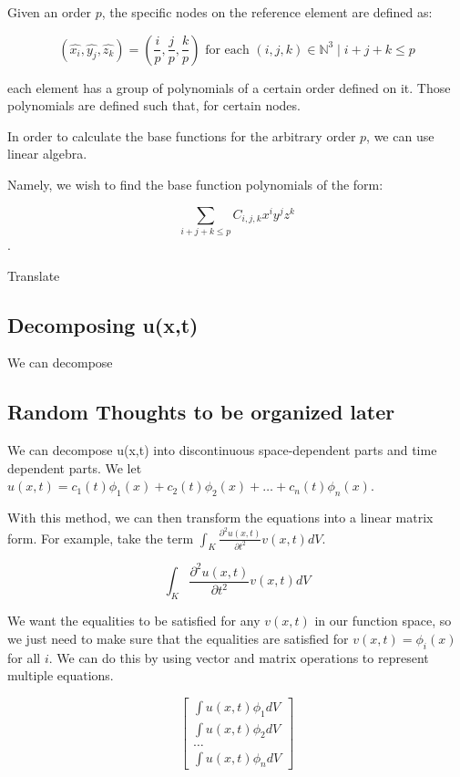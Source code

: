 Given an order $p$, the specific nodes on the reference element are defined as:

$$(\hat{x_i}, \hat{y_j}, \hat{z_k}) = \left( \frac{i}{p}, \frac{j}{p}, \frac{k}{p} \right) \text{ for each } (i,j,k) \in \mathbb{N}^3 \mid i + j + k \leq p$$ 

each element has a group of polynomials of a certain order defined on it. Those polynomials are defined such that, for certain nodes.


In order to calculate the base functions for the arbitrary order $p$, we can use linear algebra. 


Namely, we wish to find the base function polynomials of the form:

$$\sum\limits_{i+j+k \leq p} C_{i,j,k} x^i y^j z^k $$. 

Translate

\subsection{Decomposing u(x,t)}

We can decompose 

\subsection{Random Thoughts to be organized later}

We can decompose u(x,t) into discontinuous space-dependent parts and time dependent parts. We let $u(x,t) = c_1(t) \phi_1(x) + c_2(t) \phi_2(x) + \ldots + c_n(t) \phi_n(x)$. 

With this method, we can then transform the equations into a linear matrix form. For example, take the term $\int_K \frac{\partial^2 u(x,t)}{\partial t^2} v(x,t) dV$.

$$\int_K \frac{\partial^2 u(x,t)}{\partial t^2} v(x,t) dV$$

We want the equalities to be satisfied for any $v(x,t)$ in our function space, so we just need to make sure that the equalities are satisfied for $v(x,t) = \phi_i(x)$ for all $i$. We can do this by using vector and matrix operations to represent multiple equations.


$$\begin{bmatrix}
\int u(x,t) \phi_1 dV \\
\int u(x,t) \phi_2 dV \\
\ldots \\
\int u(x,t) \phi_n dV
\end{bmatrix}$$

